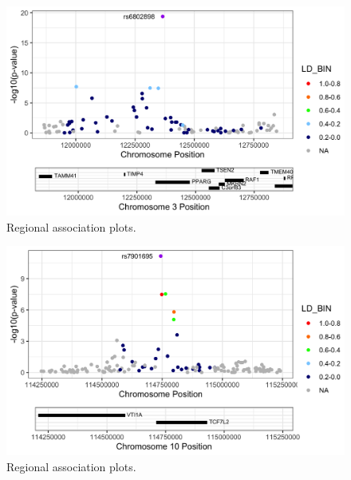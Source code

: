 \documentclass[
]{book}
\begin{document}
\begin{figure}

{\centering \includegraphics[width=25.25in]{img/rs6802898.rs6802898.regional_assoc} 

}

\caption{Regional association plots.}\label{fig:show-racer}
\end{figure}
\begin{figure}

{\centering \includegraphics[width=25.25in]{img/rs7901695.rs7901695.regional_assoc} 

}

\caption{Regional association plots.}\label{fig:show-racer}
\end{figure}
\end{document}
